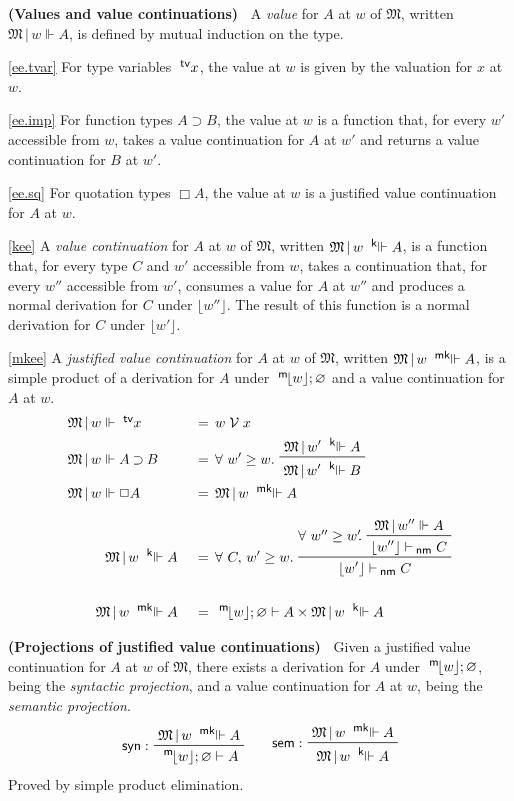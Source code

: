\documentclass{entcs}
\numberwithin{equation}{thm}
\newcommand{\tsf}[1]{\textsf{\upshape{#1}}}
\newcommand{\stsf}[1]{\tsf{\small{#1}}}
\renewcommand{\:}{\mathrel{:}}
\newcommand{\tyrule}[1]{\prftree[l]{${#1} \:\,$}}
\let\oldforall\forall
\renewcommand{\forall}{\oldforall\,}
\newcommand{\0}{\varnothing}
\newcommand{\tvar}{\operatorname{^{\stsf{tv}\mkern-4mu}}}
\newcommand{\imp}{\mathbin{\supset}}
\newcommand{\sq}{\Box}
\renewcommand{\e}{\mathrel{\vdash}}
\newcommand{\enm}{\mathrel{\vdash_{\mkern-2mu\stsf{nm}}}}
\newcommand{\M}{\mathfrak{M}}
\newcommand{\V}{\mathrel{\mathcal{V}}}
\newcommand{\peek}[1]{\mathopen{\lfloor}{#1}\mathclose{\rfloor}}
\newcommand{\mpeek}[1]{\mathopen{^{\stsf{m}\mkern-3mu}\lfloor}{#1}\mathclose{\rfloor}}
\newcommand{\ee}{\mathrel{\Vdash}}
\newcommand{\kee}{\mathrel{^{\stsf{k}\mkern-6mu}\Vdash}}
\newcommand{\mkee}{\mathrel{^{\stsf{mk}\mkern-6mu}\Vdash}}
\newcommand{\syn}{\operatorname{\tsf{syn}}}
\newcommand{\sem}{\operatorname{\tsf{sem}}}
\begin{document}
\begin{definition}
  \textbf{(Values and value continuations)\ }
  \label{ee/kee/mkee}
  A \emph{value} for $A$ at $w$ of $\M$, written $\M\,|\,w \ee A$, is defined by mutual induction on the type.
  
  \eqref{ee.tvar} For type variables $\tvar x$, the value at $w$ is given by the valuation for $x$ at $w$.
  
  \eqref{ee.imp} For function types $A \imp B$, the value at $w$ is a function that, for every $w'$ accessible from $w$, takes a value continuation for $A$ at $w'$ and returns a value continuation for $B$ at $w'$.
  
  \eqref{ee.sq} For quotation types $\sq A$, the value at $w$ is a justified value continuation for $A$ at $w$.
  
  \eqref{kee} A \emph{value continuation} for $A$ at $w$ of $\M$, written $\M\,|\,w \kee A$, is a function that, for every type $C$ and $w'$ accessible from $w$, takes a continuation that, for every $w''$ accessible from $w'$, consumes a value for $A$ at $w''$ and produces a normal derivation for $C$ under $\peek{w''}$.  The result of this function is a normal derivation for $C$ under $\peek{w'}$.
  
  \eqref{mkee} A \emph{justified value continuation} for $A$ at $w$ of $\M$, written $\M\,|\,w \mkee A$, is a simple product of a derivation for $A$ under $\mpeek{w}; \0$ and a value continuation for $A$ at $w$.
  \begin{alignat}{3}
    \label{ee.tvar} & \rlap{$\M\,|\,w \ee \tvar x$}  &&\,&&=\, w \V x\\
    \label{ee.imp}  & \rlap{$\M\,|\,w \ee A \imp B$} &&\,&&=\, \forall w' \ge w.\ \raisebox{-8pt}{\prftree{\M\,|\,w' \kee A} {\M\,|\,w' \kee B}}\\
    \label{ee.sq}   & \rlap{$\M\,|\,w \ee \sq A$}    &&\,&&=\, \M\,|\,w \mkee A\\[0.5\baselineskip]
    \label{kee}     && \quad \M\,|\,w \kee A         &\,&&=\, \forall C,\,w' \ge w.\ \raisebox{-8pt}{\prftree{\raisebox{8pt}{$\forall w'' \ge w'\mkern-4mu.\ $} \prftree{\M\,|\,w'' \ee A}{\lfloor w'' \rfloor \enm C}}{\lfloor w' \rfloor \enm C}}\\[\baselineskip]
    \label{mkee}    && \quad \M\,|\,w \mkee A        &\,&&=\, \mpeek{w}; \0 \e A \times \M\,|\,w \kee A
  \end{alignat}
\end{definition}

\begin{lemma}
  \normalshape
  \textbf{(Projections of justified value continuations)\ }
  \label{syn/sem}
  Given a justified value continuation for $A$ at $w$ of $\M$, there exists a derivation for $A$ under $\mpeek{w}; \0$, being the \emph{syntactic projection}, and a value continuation for $A$ at $w$, being the \emph{semantic projection}.
  \begin{gather*}
    \tyrule{\syn}{\M\,|\, w \mkee A}{\mpeek{w}; \0 \e A}\qquad
    \tyrule{\sem}{\M\,|\, w \mkee A}{\M\,|\, w \kee A}
  \end{gather*}
  Proved by simple product elimination.
\end{lemma}
\end{document}
